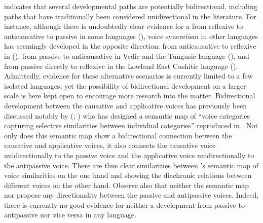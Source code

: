  indicates that several developmental paths are potentially bidirectional, including paths that have traditionally been considered unidirectional in the literature. For instance, although there is undoubtedly clear evidence for a  from reflexive to anticausative to passive in some languages (), voice syncretism in other languages has seemingly developed in the opposite direction: from anticausative to reflexive in  (), from passive to anticausative in Vedic  and the Tungusic language  (), and from passive directly to reflexive in the Lowland East Cushitic language  (). Admittedly, evidence for these alternative scenarios is currently limited to a few isolated languages, yet the possibility of bidirectional development on a larger scale is here kept open to encourage more research into the matter. Bidirectional development between the causative and applicative voices has previously been discussed notably by \citeauthor{malchukov:2015} (\citeyear{malchukov:2015, malchukov:2016}; \citeyear[24]{malchukov:2017}) who has designed a semantic map of “voice categories capturing selective similarities between individual categories” reproduced in . Not only does this semantic map show a bidirectional connection between the causative and applicative voices, it also connects the causative voice unidirectionally to the passive voice and the applicative voice unidirectionally to the antipassive voice. There are thus clear similarities between \citeauthor{malchukov:2015}’s semantic map of voice similarities on the one hand and  showing the diachronic relations between different voices on the other hand. Observe also that neither the semantic map nor  propose any directionality between the passive and antipassive voices. Indeed, there is currently no good evidence for neither a development from passive to antipassive nor vice versa in any language. 

